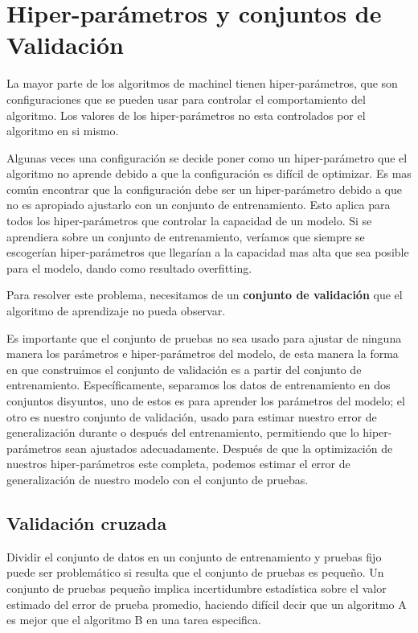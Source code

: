 \section{Hiper-parámetros y conjuntos de Validación}
La mayor parte de los algoritmos de \gls{machinel} tienen hiper-parámetros, que son configuraciones que se pueden usar para controlar el comportamiento del algoritmo. Los valores de los hiper-parámetros no esta controlados por el algoritmo en si mismo.

Algunas veces una configuración se decide poner como un hiper-parámetro que el algoritmo no aprende debido a que la configuración es difícil de optimizar. Es mas común encontrar que la configuración debe ser un hiper-parámetro debido a que no es apropiado ajustarlo con un conjunto de entrenamiento. Esto aplica para todos los hiper-parámetros que controlar la capacidad de un modelo. Si se aprendiera sobre un conjunto de entrenamiento, veríamos que siempre se escogerían hiper-parámetros que llegarían a la capacidad mas alta que sea posible para el modelo, dando como resultado \gls{overfitting}.

Para resolver este problema, necesitamos de un \textbf{conjunto de validación} que el algoritmo de aprendizaje no pueda observar.

Es importante que el conjunto de pruebas no sea usado para ajustar de ninguna manera los parámetros e hiper-parámetros del modelo, de esta manera la forma en que construimos el conjunto de validación es a partir del conjunto de entrenamiento. Específicamente, separamos los datos de entrenamiento en dos conjuntos disyuntos, uno de estos es para aprender los parámetros del modelo; el otro es nuestro conjunto de validación, usado para estimar nuestro error de generalización durante o después del entrenamiento, permitiendo que lo hiper-parámetros sean ajustados adecuadamente. Después de que la optimización de nuestros hiper-parámetros este completa, podemos estimar el error de generalización de nuestro modelo con el conjunto de pruebas.

\subsection{Validación cruzada}
Dividir el conjunto de datos en un conjunto de entrenamiento y pruebas fijo puede ser problemático si resulta que el conjunto de pruebas es pequeño. Un conjunto de pruebas pequeño implica incertidumbre estadística sobre el valor estimado del error de prueba promedio, haciendo difícil decir que un algoritmo A es mejor que el algoritmo B en una tarea especifica.

